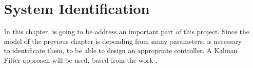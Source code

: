 \chapter{System Identification}
\label{systemIdentification}

In this chapter, is going to be address an important part of this project. Since the model of the previous chapter is depending from many parameters, is necessary to identificate them, to be able to design an appropriate controller. A Kalman Filter approach will be used, based from the work \cite{modelIdentification}.
